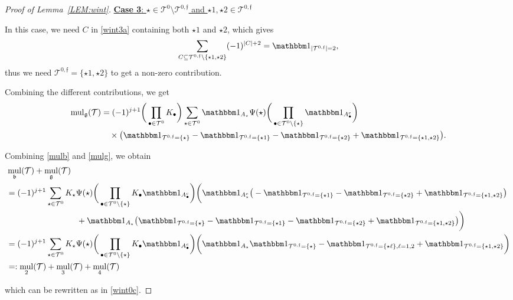 \documentclass[%
11pt,  reqno]{amsart}
\newcommand{\5}{\textup{V}}
\newcommand{\noi}{\noindent}
\newcommand{\ind}{\mathbbm 1}
\theoremstyle{remark}
\newcommand{\bul}{\bullet}
\newcommand{\TT}{\mathcal{T}}
\newcommand{\bfrak}{\mathfrak{b}}
\newcommand{\gfrak}{\mathfrak{g}}
\renewcommand{\l}{\ell}
\newcommand{\ff}{\mathfrak{f}}
\DeclareMathOperator{\mul}{mul}
\numberwithin{equation}{section}
\numberwithin{theorem}{section}
\begin{document}
\begin{proof}[Proof of Lemma~\ref{LEM:wint}]
\smallskip 

\noi
\underline{\textbf{Case 3}: $\star \in \TT^{0} \setminus \TT^{0,\ff}$ and $\star1,\star2\in \TT^{0,\ff}$}

In this case, we need $C$ in \eqref{wint3a} containing both $\star1$ and $\star2$, which gives
\begin{align}
\sum_{C\subseteq \TT^{0,\ff} \setminus\{\star1, \star2\}} (-1)^{|C|+2} = \ind_{|\TT^{0,\ff}|=2}, 
\end{align}
thus we need $\TT^{0,\ff} = \{\star1, \star2\}$ to get a non-zero contribution.

Combining the different contributions, we get
\begin{align}\label{mulg}
{\mul}_\gfrak (\TT) 
& =
(-1)^{j+1}
		\bigg( \prod_{\bul \in \TT^0} K_\bul \bigg) 
 \sum_{\star \in \TT^0} \ind_{A_\star} \Psi(\star)
		\bigg( \prod_{\bul\in\TT^0 \setminus\{\star\}} \ind_{A_\bul^c}\bigg)
\\
&
\quad \times 
 \big( 
\ind_{ \TT^{0,\ff}  = \{\star\}} 
- \ind_{ \TT^{0,\ff}  = \{\star1\}}  
- \ind_{ \TT^{0,\ff}  = \{\star2\}} 
+\ind_{ \TT^{0,\ff}  = \{\star1, \star2\}}
\big).
\end{align}


Combining \eqref{mulb} and \eqref{mulg}, we obtain
\begin{align}
    & 
     \mul_\bfrak (\TT) + \mul_\gfrak(\TT) 
     \\
&
= 
(-1)^{j+1}
\sum_{\star\in \TT^0} K_\star \Psi(\star)
\bigg( \prod_{\bul \in \TT^0 \setminus \{\star\}} K_\bul \ind_{A^c_\bul} \bigg)
\bigg(
\ind_{A_\star^c}  
\big( 
- \ind_{\TT^{0,\ff} = \{\star1\}} - \ind_{\TT^{0,\ff} = \{\star2\}} + \ind_{\TT^{0,\ff} = \{\star1, \star2\}}
\big)
\\
&
\hspace{3cm}
+
\ind_{A_\star} 
\big( 
\ind_{ \TT^{0,\ff}  = \{\star\}} 
- \ind_{ \TT^{0,\ff}  = \{\star1\}}  
- \ind_{ \TT^{0,\ff}  = \{\star2\}} 
+\ind_{ \TT^{0,\ff}  = \{\star1, \star2\}}
\big)
\bigg)
\\
&
= 
(-1)^{j+1}
\sum_{\star\in \TT^0} K_\star \Psi(\star)
\bigg( \prod_{\bul \in \TT^0 \setminus \{\star\}} K_\bul \ind_{A^c_\bul} \bigg)
\bigg(
\ind_{A_\star}
\ind_{\TT^{0,\ff} = \{\star\}}
-
\ind_{\TT^{0,\ff}=\{\star\l\}, \l=1,2 }
+
\ind_{\TT^{0,\ff} = \{\star1,\star2\}}
\bigg)
\\
&
= : \mul_2(\TT) + \mul_3(\TT) + \mul_4(\TT)
\end{align}

\noi 
which can be rewritten as in \eqref{wint0c}.
\qedhere


	
\end{proof}
\end{document}
